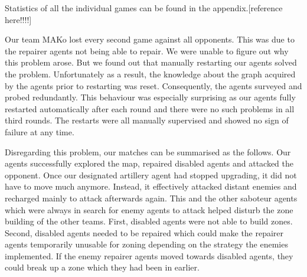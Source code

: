 Statistics of all the individual games can be found in the appendix.[reference here!!!!] %

Our team MAKo lost every second game against all opponents.
This was due to the repairer agents not being able to repair.
We were unable to figure out why this problem arose.
But we found out that manually restarting our agents solved the problem.
Unfortunately as a result, the knowledge about the graph acquired by the agents prior to restarting was reset.
Consequently, the agents surveyed and probed redundantly.
This behaviour was especially surprising as our agents fully restarted automatically after each round and there were no such problems in all third rounds.
The restarts were all manually supervised and showed no sign of failure at any time.

Disregarding this problem, our matches can be summarised as the follows.
Our agents successfully explored the map, repaired disabled agents and attacked the opponent.
Once our designated artillery agent had stopped upgrading, it did not have to move much anymore.
Instead, it effectively attacked distant enemies and recharged mainly to attack afterwards again.
This and the other saboteur agents which were always in search for enemy agents to attack helped disturb the zone building of the other teams.
First, disabled agents were not able to build zones.
Second, disabled agents needed to be repaired which could make the repairer agents temporarily unusable for zoning depending on the strategy the enemies implemented.
If the enemy repairer agents moved towards disabled agents, they could break up a zone which they had been in earlier.

